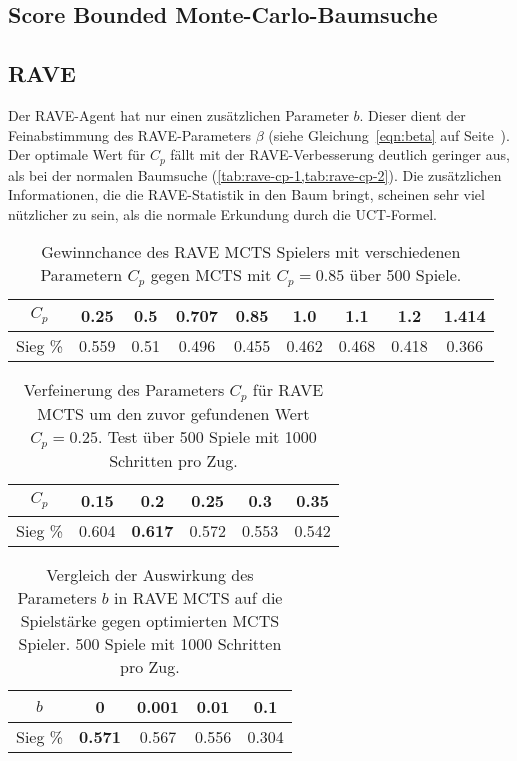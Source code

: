 \pagebreak[1]
\subsection{Score Bounded Monte-Carlo-Baumsuche}


\pagebreak[1]
\subsection{RAVE}

Der RAVE-Agent hat nur einen zusätzlichen Parameter $b$. Dieser dient der Feinabstimmung des RAVE-Parameters $\beta$ (siehe Gleichung~\ref{eqn:beta} auf Seite~\pageref{eqn:beta}).
Der optimale Wert für $C_p$ fällt mit der RAVE-Verbesserung deutlich geringer aus, als bei der normalen Baumsuche (\cref{tab:rave-cp-1,tab:rave-cp-2}).
Die zusätzlichen Informationen, die die RAVE-Statistik in den Baum bringt, scheinen sehr viel nützlicher zu sein, als die normale Erkundung durch die UCT-Formel.

\begin{table}[h!]
	\centering
	\begin{tabular}{|c||c|c|c|c|c|c|c|c|}
		\hline
		$C_p$ & 0.25 & 0.5 & 0.707 & 0.85 & 1.0 & 1.1 & 1.2 & 1.414 \\
		\hline
		Sieg \% & 0.559 & 0.51 & 0.496 & 0.455 & 0.462 & 0.468 & 0.418 & 0.366 \\
		\hline
	\end{tabular}
	\caption{Gewinnchance des RAVE MCTS Spielers mit verschiedenen Parametern $C_p$ gegen MCTS mit $C_p=0.85$ über 500 Spiele.}
	\label{tab:rave-cp-1}
\end{table}

\begin{table}[h!]
	\centering
	\begin{tabular}{|c||c|c|c|c|c|}
		\hline
		$C_p$ & 0.15 & 0.2 & 0.25 & 0.3 & 0.35 \\
		\hline
		Sieg \% & 0.604 & \textbf{0.617} & 0.572 & 0.553 & 0.542 \\
		\hline
	\end{tabular}
	\caption{Verfeinerung des Parameters $C_p$ für RAVE MCTS um den zuvor gefundenen Wert $C_p=0.25$. Test über 500 Spiele mit 1000 Schritten pro Zug.}
	\label{tab:rave-cp-2}
\end{table}


\begin{table}[h!]
	\centering
	\begin{tabular}{|c||c|c|c|c|}
		\hline
		$b$ & 0 & 0.001 & 0.01 & 0.1 \\
		\hline
		Sieg \% & \textbf{0.571} & 0.567 & 0.556 & 0.304 \\
		\hline
	\end{tabular}
	\caption{Vergleich der Auswirkung des Parameters $b$ in RAVE MCTS auf die Spielstärke gegen optimierten MCTS Spieler. 500 Spiele mit 1000 Schritten pro Zug.}
	\label{tab:rave-best-param}
\end{table}

